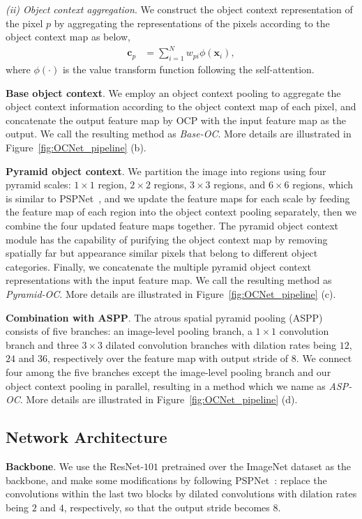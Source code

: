 \documentclass[10pt,twocolumn,letterpaper]{article}
\begin{document}
\emph{(ii) Object context aggregation}.
We construct the object context representation of the pixel $p$ by 
aggregating the representations of the pixels according to the object context map as below,
\begin{align}
\mathbf{c}_p &= \sum_{i=1}^N w_{pi} \phi(\mathbf{x}_i),
\end{align}
where $\phi(\cdot)$ is the value transform function following the self-attention.

\vspace{.1cm}
\noindent\textbf{Base object context}.
We employ an object context pooling to aggregate the object context information according to the
object context map of each pixel,
and concatenate the output feature map by OCP with the input feature map as the output. 
We call the resulting method as \emph{Base-OC}. More details are illustrated in Figure~\ref{fig:OCNet_pipeline} (b).

\vspace{.1cm}
\noindent\textbf{Pyramid object context}.
We partition the image into regions 
using four pyramid scales:
$1\times 1$ region,
$2\times 2$ regions,
$3\times 3$ regions,
and $6 \times 6$ regions,
which is similar to PSPNet~\cite{zhao2017pyramid}, 
and we update the feature maps for each scale
by feeding the feature map of each region 
into the object context pooling separately,
then we combine the four updated feature maps together.
The pyramid object context module has 
the capability of purifying the object context map
by removing spatially far but appearance similar pixels that
belong to different object categories.
Finally, we concatenate the multiple pyramid object context representations
with the input feature map.
We call the resulting method as \emph{Pyramid-OC}.
More details are illustrated in Figure~\ref{fig:OCNet_pipeline} (c).

\vspace{.1cm}
\noindent\textbf{Combination with ASPP}.
The atrous spatial pyramid pooling (ASPP) 
consists of five branches:
an image-level pooling branch,
a $1 \times 1$ convolution branch
and three $3 \times 3$ dilated convolution branches
with dilation rates being $12$, $24$ and $36$, respectively over 
the feature map with output stride of $8$.
We connect four among the five branches except the image-level pooling branch
and our object context pooling in parallel, 
resulting in a method which we name as \emph{ASP-OC}.
More details are illustrated in Figure~\ref{fig:OCNet_pipeline} (d).

\subsection{Network Architecture}
\noindent\textbf{Backbone}.
We use the ResNet-$101$ pretrained over the ImageNet dataset 
as the backbone, 
and make some modifications by following PSPNet~\cite{zhao2017pyramid}:
replace the convolutions within the last two blocks 
by dilated convolutions with dilation rates being $2$ and $4$, respectively,
so that the output stride becomes $8$.
\end{document}
